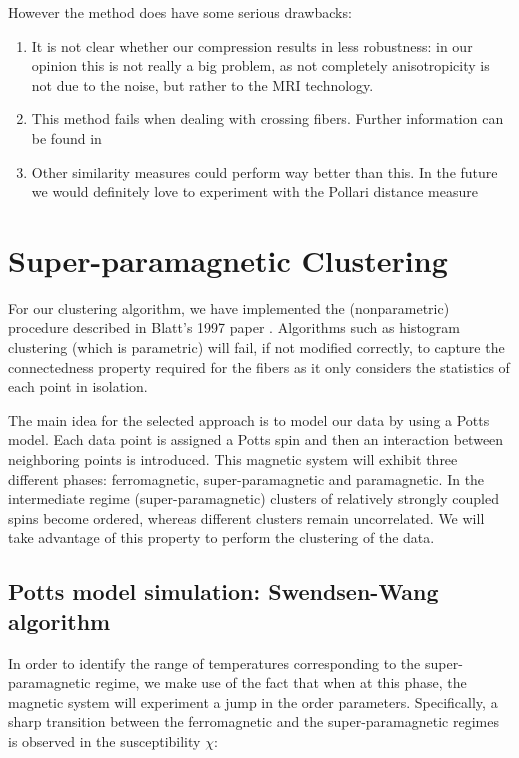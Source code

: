 \documentclass{article} %
\begin{document}
However the method does have some serious drawbacks:

\begin{enumerate}
\item It is not clear whether our compression results in less robustness: in our opinion this is not really a big problem, as not completely anisotropicity is not due to the noise, but rather to the MRI technology.
\item This method fails when dealing with crossing fibers. Further information can be found in \cite{Gee2006}
\item Other similarity measures could perform way better than this. In the future we would definitely love to experiment with the Pollari distance measure \cite{4193399}
\end{enumerate}

\section{Super-paramagnetic Clustering}

For our clustering algorithm, we have implemented the (nonparametric) procedure described in Blatt's 1997 paper \cite{Blatt1997}.  Algorithms such as histogram clustering (which is parametric) will fail, if not modified correctly, to capture the connectedness property required for the fibers as it only considers the statistics of each point in isolation.

The main idea for the selected approach is to model our data by using a Potts model. Each data point is assigned a Potts spin and then an interaction between neighboring points is introduced. This magnetic system will exhibit three different phases: ferromagnetic, super-paramagnetic and paramagnetic. In the intermediate regime (super-paramagnetic) clusters of relatively strongly coupled spins become ordered, whereas different clusters remain uncorrelated. We will take advantage of this property to perform the clustering of the data.

\subsection{Potts model simulation: Swendsen-Wang algorithm}

In order to identify the range of temperatures corresponding to the super-paramagnetic regime, we make use of the fact that when at this phase, the magnetic system will experiment a jump in the order parameters. Specifically, a sharp transition between the ferromagnetic and the super-paramagnetic regimes is observed in the susceptibility $\chi$:
\end{document}
